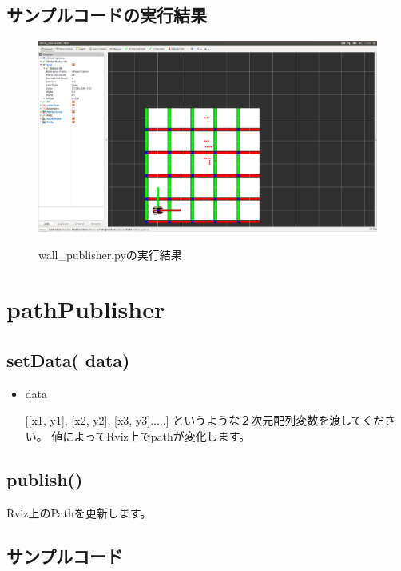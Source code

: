 \documentclass[11pt,a4paper]{jsarticle}
\begin{document}
\subsection*{サンプルコードの実行結果}
\begin{figure}[h]
  \includegraphics[width=150mm]{./wall_publisher.png}
  \label{wall}
  \caption{wall\_publisher.pyの実行結果}
\end{figure}



\newpage
\section*{pathPublisher}
\subsection*{setData( data)}

\begin{itemize}
\item{data}

[[x1, y1], [x2, y2], [x3, y3].....]
というような２次元配列変数を渡してください。
値によってRviz上でpathが変化します。
\end{itemize}

\subsection*{publish()}
Rviz上のPathを更新します。


\subsection*{サンプルコード}

\end{document}
